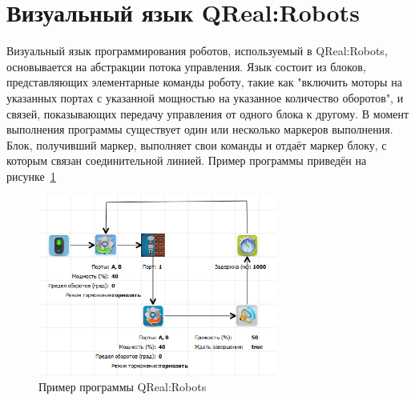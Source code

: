 \documentclass[a4paper]{article}
\begin{document}
\section{Визуальный язык QReal:Robots}
Визуальный язык программирования роботов, используемый в QReal:Robots, основывается на абстракции потока управления. Язык состоит из блоков, представляющих элементарные команды роботу, такие как "включить моторы на указанных портах с указанной мощностью на указанное количество оборотов", и связей, показывающих передачу управления от одного блока к другому. В момент выполнения программы существует один или несколько маркеров выполнения. Блок, получивший маркер, выполняет свои команды и отдаёт маркер блоку, с которым связан соединительной линией. Пример программы приведён на рисунке~\ref{programExample}

\begin{figure} [ht]
  \begin{center}
    \includegraphics[width=0.7\textwidth]{programExample.png}
    \caption{Пример программы QReal:Robots}
    \label{programExample}
  \end{center}
\end{figure}
\end{document}
